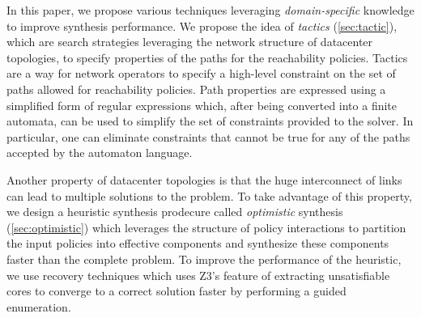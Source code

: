 In this paper, we propose various techniques leveraging
\emph{domain-specific} knowledge to improve synthesis performance. We
propose the idea of \emph{tactics} (\cref{sec:tactic}), which are
search strategies leveraging the network structure of datacenter topologies, 
to specify properties of the paths for the reachability policies.  Tactics are 
a way for network operators to specify a high-level constraint on the set 
of paths allowed for reachability policies. 
Path properties are expressed using a simplified form of regular expressions which,
after being converted into a finite automata,
can be used
to simplify the set of constraints provided to the solver.
In particular, one can eliminate constraints that cannot be true for any of the paths
accepted by the automaton language. 


Another
property of datacenter topologies is that the huge interconnect of
links can lead to multiple solutions to the problem. 
To take advantage of this property, we design a
heuristic synthesis prodecure called \emph{optimistic} synthesis
(\cref{sec:optimistic}) which leverages the structure of policy
interactions to partition the input policies
into effective components and synthesize these components 
faster than the complete problem. To improve the performance of the heuristic, 
we use recovery techniques which uses Z3's feature of extracting 
unsatisfiable cores to converge to a correct solution faster by performing 
a guided enumeration.

